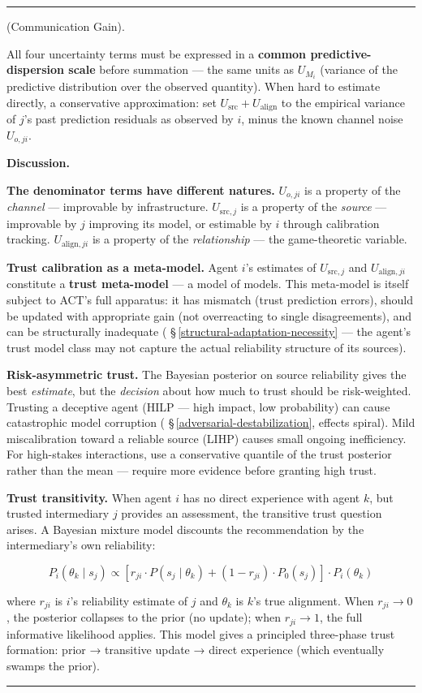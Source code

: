 \documentclass[11pt,oneside]{article}
\newcounter{claim}[section]
\renewcommand{\theclaim}{\thesection.\arabic{claim}}
\newenvironment{segment}[2]{%
  \refstepcounter{claim}%
  \bigskip\noindent\hrule\smallskip
  \noindent{\bfseries #1~\theclaim}\enskip(#2).\par\smallskip
  \noindent\ignorespaces
}{%
  \par\smallskip\noindent\hrule\bigskip
}
\newenvironment{hypothesis}[1][]{\begin{segment}{Hypothesis}{#1}}{\end{segment}}
\begin{document}
\begin{hypothesis}[Communication Gain]
All four uncertainty terms must be expressed in a \textbf{common predictive-dispersion scale} before summation — the same units as $U_{M_i}$ (variance of the predictive distribution over the observed quantity). When hard to estimate directly, a conservative approximation: set $U_{\text{src}} + U_{\text{align}}$ to the empirical variance of $j$'s past prediction residuals as observed by $i$, minus the known channel noise $U_{o,ji}$.


\medskip\noindent\textbf{Discussion.}


\textbf{The denominator terms have different natures.} $U_{o,ji}$ is a property of the \textit{channel} — improvable by infrastructure. $U_{\text{src},j}$ is a property of the \textit{source} — improvable by $j$ improving its model, or estimable by $i$ through calibration tracking. $U_{\text{align},ji}$ is a property of the \textit{relationship} — the game-theoretic variable.

\textbf{Trust calibration as a meta-model.} Agent $i$'s estimates of $U_{\text{src},j}$ and $U_{\text{align},ji}$ constitute a \textbf{trust meta-model} — a model of models. This meta-model is itself subject to ACT's full apparatus: it has mismatch (trust prediction errors), should be updated with appropriate gain (not overreacting to single disagreements), and can be structurally inadequate ( \S\,\ref{structural-adaptation-necessity} — the agent's trust model class may not capture the actual reliability structure of its sources).

\textbf{Risk-asymmetric trust.} The Bayesian posterior on source reliability gives the best \textit{estimate}, but the \textit{decision} about how much to trust should be risk-weighted. Trusting a deceptive agent (HILP — high impact, low probability) can cause catastrophic model corruption ( \S\,\ref{adversarial-destabilization}, effects spiral). Mild miscalibration toward a reliable source (LIHP) causes small ongoing inefficiency. For high-stakes interactions, use a conservative quantile of the trust posterior rather than the mean — require more evidence before granting high trust.

\textbf{Trust transitivity.} When agent $i$ has no direct experience with agent $k$, but trusted intermediary $j$ provides an assessment, the transitive trust question arises. A Bayesian mixture model discounts the recommendation by the intermediary's own reliability:

$$P_i(\theta_k \mid s_j) \propto \left[r_{ji} \cdot P(s_j \mid \theta_k) + (1 - r_{ji}) \cdot P_0(s_j)\right] \cdot P_i(\theta_k)$$

where $r_{ji}$ is $i$'s reliability estimate of $j$ and $\theta_k$ is $k$'s true alignment. When $r_{ji} \to 0$, the posterior collapses to the prior (no update); when $r_{ji} \to 1$, the full informative likelihood applies. This model gives a principled three-phase trust formation: prior → transitive update → direct experience (which eventually swamps the prior).

\end{hypothesis}
\end{document}
